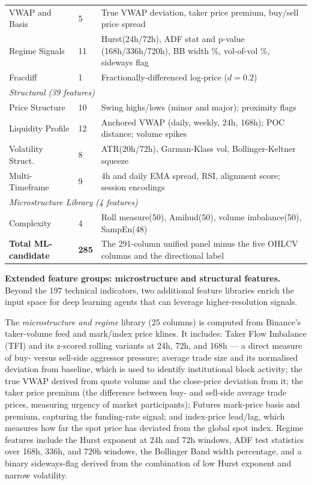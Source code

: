 \begin{longtable}{ll>{\raggedright\arraybackslash\hyphenpenalty=10000\exhyphenpenalty=10000}p{7.5cm}}
        VWAP and Basis       & 5  & True VWAP deviation, taker price premium, buy/sell price spread \\
        Regime Signals       & 11 & Hurst(24h/72h), ADF stat and p-value (168h/336h/720h), BB width \%, vol-of-vol \%, sideways flag \\
        Fracdiff             & 1  & Fractionally-differenced log-price ($d = 0.2$) \\
        \midrule
        \multicolumn{3}{l}{\textit{Structural (39 features)}} \\
        Price Structure      & 10 & Swing highs/lows (minor and major); proximity flags \\
        Liquidity Profile    & 12 & Anchored VWAP (daily, weekly, 24h, 168h); POC distance; volume spikes \\
        Volatility Struct.   & 8  & ATR(20h/72h), Garman-Klass vol, Bollinger-Keltner squeeze \\
        Multi-Timeframe      & 9  & 4h and daily EMA spread, RSI, alignment score; session encodings \\
        \midrule
        \multicolumn{3}{l}{\textit{Microstructure Library (4 features)}} \\
        Complexity           & 4  & Roll measure(50), Amihud(50), volume imbalance(50), SampEn(48) \\
        \midrule
        \textbf{Total ML-candidate}  & \textbf{285} & The 291-column unified panel minus the five OHLCV columns and the directional label \\
        \bottomrule
\end{longtable}
\normalsize


\textbf{Extended feature groups: microstructure and structural features.}
Beyond the 197 technical indicators, two additional feature libraries enrich the input space for deep learning agents that can leverage higher-resolution signals.


The \textit{microstructure and regime} library (25 columns) is computed from Binance's taker-volume feed and mark/index price klines. It includes: Taker Flow Imbalance (TFI) and its z-scored rolling variants at 24h, 72h, and 168h — a direct measure of buy- versus sell-side aggressor pressure; average trade size and its normalised deviation from baseline, which is used to identify institutional block activity; the true VWAP derived from quote volume and the close-price deviation from it; the taker price premium (the difference between buy- and sell-side average trade prices, measuring urgency of market participants); Futures mark-price basis and premium, capturing the funding-rate signal; and index-price lead/lag, which measures how far the spot price has deviated from the global spot index. Regime features include the Hurst exponent at 24h and 72h windows, ADF test statistics over 168h, 336h, and 720h windows, the Bollinger Band width percentage, and a binary sideways-flag derived from the combination of low Hurst exponent and narrow volatility.


